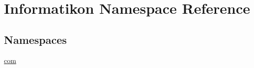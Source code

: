 \hypertarget{namespace_informatikon}{}\section{Informatikon Namespace Reference}
\label{namespace_informatikon}
\subsection*{Namespaces}
\begin{DoxyCompactItemize}
\item 
 \hyperlink{namespace_informatikon_1_1com}{com}
\end{DoxyCompactItemize}
